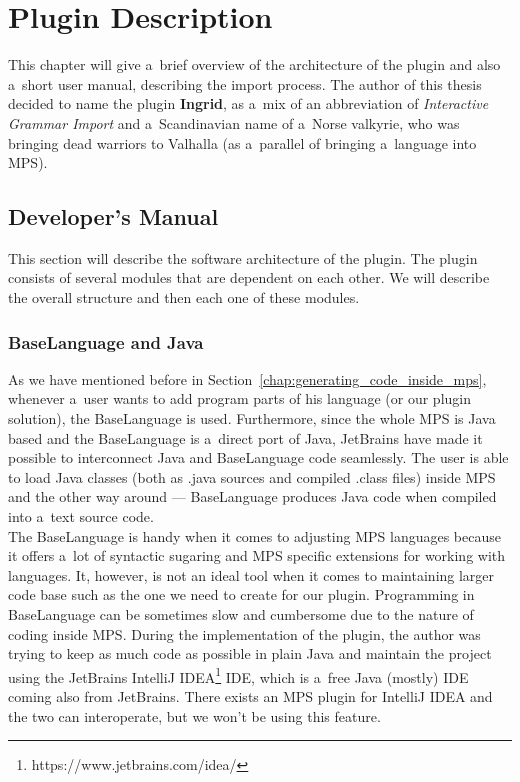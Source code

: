 \chapter{Plugin Description}

This chapter will give a~brief overview of the architecture of the plugin and also a~short user manual, describing the import process.
The author of this thesis decided to name the plugin \textbf{Ingrid}, as a~mix of an abbreviation of \textit{Interactive Grammar Import} and a~Scandinavian name of a~Norse valkyrie, who was bringing dead warriors to Valhalla (as a~parallel of bringing a~language into MPS).

\section{Developer's Manual}

This section will describe the software architecture of the plugin.
The plugin consists of several modules that are dependent on each other.
We will describe the overall structure and then each one of these modules.

\subsection{BaseLanguage and Java}

As we have mentioned before in Section~\ref{chap:generating_code_inside_mps}, whenever a~user wants to add program parts of his language (or our plugin solution), the BaseLanguage is used.
Furthermore, since the whole MPS is Java based and the BaseLanguage is a~direct port of Java, JetBrains have made it possible to interconnect Java and BaseLanguage code seamlessly.
The user is able to load Java classes (both as .java sources and compiled .class files) inside MPS and the other way around --- BaseLanguage produces Java code when compiled into a~text source code.
\\

The BaseLanguage is handy when it comes to adjusting MPS languages because it offers a~lot of syntactic sugaring and MPS specific extensions for working with languages.
It, however, is not an ideal tool when it comes to maintaining larger code base such as the one we need to create for our plugin.
Programming in BaseLanguage can be sometimes slow and cumbersome due to the nature of coding inside MPS.
During the implementation of the plugin, the author was trying to keep as much code as possible in plain Java and maintain the project using the JetBrains IntelliJ IDEA\footnote{https://www.jetbrains.com/idea/} IDE, which is a~free Java (mostly) IDE coming also from JetBrains.
There exists an MPS plugin for IntelliJ IDEA and the two can interoperate, but we won't be using this feature.
\\

